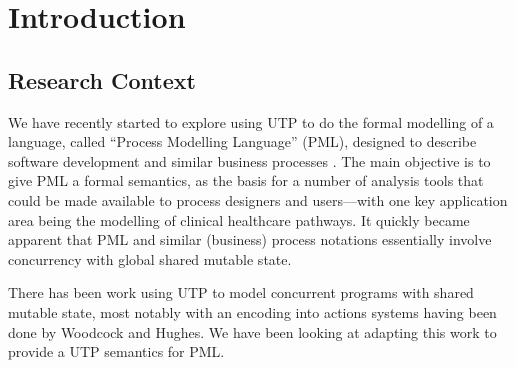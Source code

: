 \section{Introduction}\label{sec:Intro}

\subsection{Research Context}\label{ssec:context}

We have recently started to explore using UTP
to do the  formal modelling of a language,
called ``Process Modelling Language'' (PML),
designed to describe software development and similar business
processes \cite{DBLP:journals/infsof/AtkinsonWN07}.
The main objective is to give PML a formal semantics,
as the basis for a number of analysis tools that could be made available
to process designers and users---with one key application
area being the modelling of clinical healthcare pathways.
It quickly became apparent that PML and similar (business) process
notations essentially involve concurrency with global shared mutable state.

There has been work using UTP
to model concurrent programs with shared mutable state,
most notably
with an encoding into actions systems having been done by
Woodcock and Hughes\cite{DBLP:conf/icfem/WoodcockH02}.
We have been looking at adapting this work to provide a UTP semantics
for PML.

